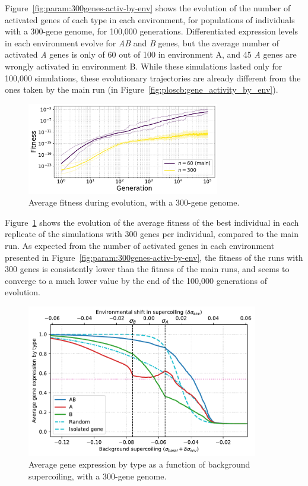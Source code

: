 Figure~\ref{fig:param:300genes-activ-by-env} shows the evolution of the number of activated genes of each type in each environment, for populations of individuals with a 300-gene genome, for 100,000 generations.
Differentiated expression levels in each environment evolve for \emph{AB} and \emph{B} genes, but the average number of activated \emph{A} genes is only of 60 out of 100 in environment A, and 45 \emph{A} genes are wrongly activated in environment B.
While these simulations lasted only for 100,000 simulations, these evolutionary trajectories are already different from the ones taken by the main run (in Figure~\ref{fig:ploscb:gene_activity_by_env}).

\begin{figure}[H]
\centering
\includegraphics[width=0.75\textwidth]{param/300-genes/fitness_all_with_main.pdf}
\caption[Average fitness during evolution, with a 300-gene genome]{Average fitness during evolution, with a 300-gene genome.}
\label{fig:param:300gene-fitness}
\end{figure}

Figure~\ref{fig:param:300gene-fitness} shows the evolution of the average fitness of the best individual in each replicate of the simulations with 300 genes per individual, compared to the main run.
As expected from the number of activated genes in each environment presented in Figure~\ref{fig:param:300genes-activ-by-env}, the fitness of the runs with 300 genes is consistently lower than the fitness of the main runs, and seems to converge to a much lower value by the end of the 100,000 generations of evolution.

\begin{figure}[H]
\centering
\includegraphics[width=0.9\textwidth]{param/300-genes/activity_sigmas_avg.pdf}
\caption[Average gene expression as a function of background supercoiling, with a 300-gene genome]{Average gene expression by type as a function of background supercoiling, with a 300-gene genome.}
\label{fig:param:300genes-activ-by-sigma}
\end{figure}

